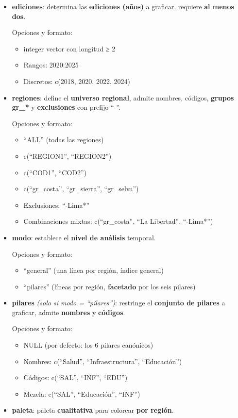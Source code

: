 \documentclass[
  11pt,
  letterpaper,
  DIV=11,
  numbers=noendperiod]{scrartcl}
\begin{document}
\begin{itemize}
\item
  \textbf{ediciones}: determina las \textbf{ediciones (años)} a
  graficar, requiere \textbf{al menos dos}.

  Opciones y formato:

  \begin{itemize}
  \item
    integer vector con longitud ≥ 2
  \item
    Rangos: 2020:2025
  \item
    Discretos: c(2018, 2020, 2022, 2024)
  \end{itemize}
\item
  \textbf{regiones}: define el \textbf{universo regional}, admite
  nombres, códigos, \textbf{grupos gr\_*} y \textbf{exclusiones} con
  prefijo ``-''.

  Opciones y formato:

  \begin{itemize}
  \item
    ``ALL'' (todas las regiones)
  \item
    c(``REGION1'', ``REGION2'')
  \item
    c(``COD1'', ``COD2'')
  \item
    c(``gr\_costa'', ``gr\_sierra'', ``gr\_selva'')
  \item
    Exclusiones: ``-Lima*''
  \item
    Combinaciones mixtas: c(``gr\_costa'', ``La Libertad'', ``-Lima*'')
  \end{itemize}
\item
  \textbf{modo}: establece el \textbf{nivel de análisis} temporal.

  Opciones y formato:

  \begin{itemize}
  \item
    ``general'' (una línea por región, índice general)
  \item
    ``pilares'' (líneas por región, \textbf{facetado} por los seis
    pilares)
  \end{itemize}
\item
  \textbf{pilares} \emph{(solo si modo = ``pilares'')}: restringe el
  \textbf{conjunto de pilares} a graficar, admite \textbf{nombres} y
  \textbf{códigos}.

  Opciones y formato:

  \begin{itemize}
  \item
    NULL (por defecto: los 6 pilares canónicos)
  \item
    Nombres: c(``Salud'', ``Infraestructura'', ``Educación'')
  \item
    Códigos: c(``SAL'', ``INF'', ``EDU'')
  \item
    Mezcla: c(``SAL'', ``Educación'', ``INF'')
  \end{itemize}
\item
  \textbf{paleta}: paleta \textbf{cualitativa} para colorear \textbf{por
  región}.


\end{itemize}
\end{document}
